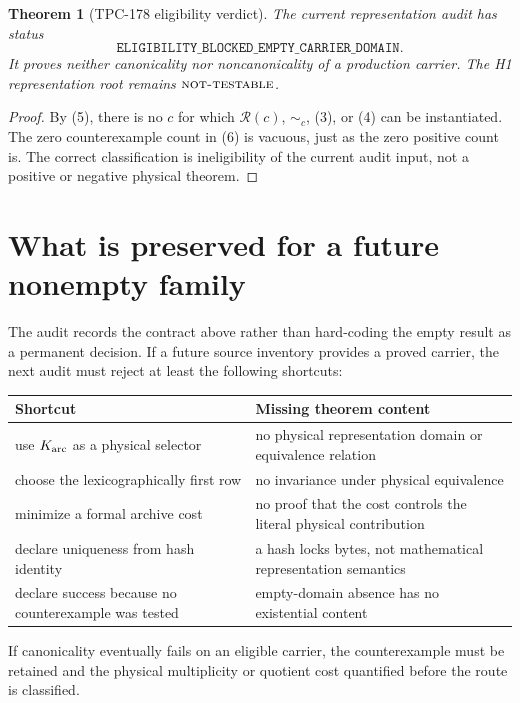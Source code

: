 \documentclass[11pt]{article}
\newtheorem{theorem}{Theorem}[section]
\theoremstyle{definition}
\theoremstyle{remark}
\newcommand{\NT}{\textnormal{\textsc{not-testable}}}
\begin{document}
\begin{theorem}[TPC-178 eligibility verdict]
The current representation audit has status
\[
 \texttt{ELIGIBILITY\_BLOCKED\_EMPTY\_CARRIER\_DOMAIN}.           \tag{7}
\]
It proves neither canonicality nor noncanonicality of a production
carrier.  The H1 representation root remains \(\NT\).
\end{theorem}

\begin{proof}
By (5), there is no \(c\) for which \(\mathcal R(c)\), \(\sim_c\),
(3), or (4) can be instantiated.  The zero counterexample count in
(6) is vacuous, just as the zero positive count is.  The correct
classification is ineligibility of the current audit input, not a
positive or negative physical theorem.
\end{proof}

\section{What is preserved for a future nonempty family}

The audit records the contract above rather than hard-coding the
empty result as a permanent decision.  If a future source inventory
provides a proved carrier, the next audit must reject at least the
following shortcuts:

\begin{center}
\begin{tabularx}{0.96\linewidth}{@{}lY@{}}
\toprule
Shortcut & Missing theorem content\\
\midrule
use \(K_{\rm arc}\) as a physical selector &
no physical representation domain or equivalence relation\\
choose the lexicographically first row &
no invariance under physical equivalence\\
minimize a formal archive cost &
no proof that the cost controls the literal physical contribution\\
declare uniqueness from hash identity &
a hash locks bytes, not mathematical representation semantics\\
declare success because no counterexample was tested &
empty-domain absence has no existential content\\
\bottomrule
\end{tabularx}
\end{center}

If canonicality eventually fails on an eligible carrier, the
counterexample must be retained and the physical multiplicity or
quotient cost quantified before the route is classified.
\end{document}
